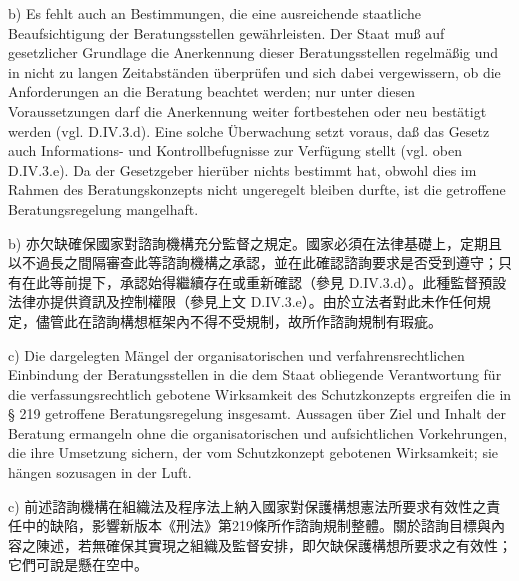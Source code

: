 \documentclass[12pt]{article}
\begin{document}
\begin{sourcepara}[title={原文E.174}]
b) Es fehlt auch an Bestimmungen, die eine ausreichende staatliche Beaufsichtigung der Beratungsstellen gewährleisten. Der Staat muß auf gesetzlicher Grundlage die Anerkennung dieser Beratungsstellen regelmäßig und in nicht zu langen Zeitabständen überprüfen und sich dabei vergewissern, ob die Anforderungen an die Beratung beachtet werden; nur unter diesen Voraussetzungen darf die Anerkennung weiter fortbestehen oder neu bestätigt werden (vgl. D.IV.3.d). Eine solche Überwachung setzt voraus, daß das Gesetz auch Informations- und Kontrollbefugnisse zur Verfügung stellt (vgl. oben D.IV.3.e). Da der Gesetzgeber hierüber nichts bestimmt hat, obwohl dies im Rahmen des Beratungskonzepts nicht ungeregelt bleiben durfte, ist die getroffene Beratungsregelung mangelhaft.
\end{sourcepara}
\begin{transpara}
b) 亦欠缺確保國家對諮詢機構充分監督之規定。國家必須在法律基礎上，定期且以不過長之間隔審查此等諮詢機構之承認，並在此確認諮詢要求是否受到遵守；只有在此等前提下，承認始得繼續存在或重新確認（參見 D.IV.3.d）。此種監督預設法律亦提供資訊及控制權限（參見上文 D.IV.3.e）。由於立法者對此未作任何規定，儘管此在諮詢構想框架內不得不受規制，故所作諮詢規制有瑕疵。
\end{transpara}

\begin{sourcepara}[title={原文E.175}]
c) Die dargelegten Mängel der organisatorischen und verfahrensrechtlichen Einbindung der Beratungsstellen in die dem Staat obliegende Verantwortung für die verfassungsrechtlich gebotene Wirksamkeit des Schutzkonzepts ergreifen die in § 219 \abbrStGB{} \abbrNF{} getroffene Beratungsregelung insgesamt. Aussagen über Ziel und Inhalt der Beratung ermangeln ohne die organisatorischen und aufsichtlichen Vorkehrungen, die ihre Umsetzung sichern, der vom Schutzkonzept gebotenen Wirksamkeit; sie hängen sozusagen in der Luft.
\end{sourcepara}
\begin{transpara}
c) 前述諮詢機構在組織法及程序法上納入國家對保護構想憲法所要求有效性之責任中的缺陷，影響新版本《刑法》第219條所作諮詢規制整體。關於諮詢目標與內容之陳述，若無確保其實現之組織及監督安排，即欠缺保護構想所要求之有效性；它們可說是懸在空中。
\end{transpara}
\end{document}
